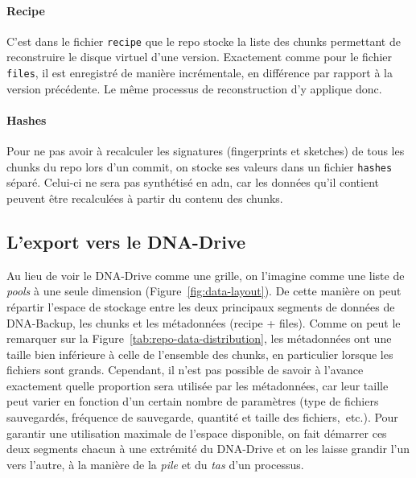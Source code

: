 \documentclass[a4paper]{report}
\begin{document}
\paragraph{Recipe}
C'est dans le fichier \verb|recipe| que le repo stocke la liste des chunks
permettant de reconstruire le disque virtuel d'une version.
Exactement comme pour le fichier \verb|files|, il est enregistré de manière incrémentale,
en différence par rapport à la version précédente.
Le même processus de reconstruction d'y applique donc.

\paragraph{Hashes}
Pour ne pas avoir à recalculer les signatures (fingerprints et sketches) de tous les chunks du repo lors d'un commit,
on stocke ses valeurs dans un fichier \verb|hashes| séparé.
Celui-ci ne sera pas synthétisé en \ac{adn},
car les données qu'il contient peuvent être recalculées à partir du contenu des chunks.


\subsection{L'export vers le DNA-Drive}

Au lieu de voir le DNA-Drive comme une grille,
on l'imagine comme une liste de \emph{pools} à une seule dimension (Figure~\ref{fig:data-layout}).
De cette manière on peut répartir l'espace de stockage
entre les deux principaux segments de données de DNA-Backup,
les chunks et les métadonnées (recipe + files).
Comme on peut le remarquer sur la Figure~\ref{tab:repo-data-distribution},
les métadonnées ont une taille bien inférieure à celle de l'ensemble des chunks,
en particulier lorsque les fichiers sont grands.
Cependant, il n'est pas possible de savoir à l'avance exactement
quelle proportion sera utilisée par les métadonnées,
car leur taille peut varier en fonction d'un certain nombre de paramètres
(type de fichiers sauvegardés, fréquence de sauvegarde, quantité et taille des fichiers,~etc.).
Pour garantir une utilisation maximale de l'espace disponible,
on fait démarrer ces deux segments chacun à une extrémité du DNA-Drive
et on les laisse grandir l'un vers l'autre,
à la manière de la \emph{pile} et du \emph{tas} d'un processus.
\end{document}
